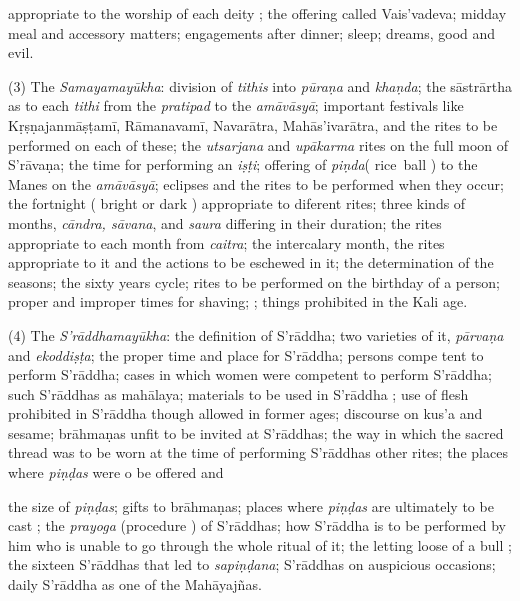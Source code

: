 \documentclass[11pt, openany]{book}
\begin{document}
\noindent
appropriate to the worship of each deity ; the offering called Vais'vadeva; midday meal and accessory matters; engagements after dinner; sleep; dreams, good and evil.

(3) The \emph{\en Samayamayūkha}: division of \emph{\en tithis} into \emph{\en pūraṇa} and \emph{\en khaṇda}; the sāstrārtha as to each \emph{\en tithi} from the \emph{\en pratipad} to the \emph{\en amāvāsyā}; important festivals like Kṛṣṇajanmāṣṭamī, Rāmanavamī, Navarātra, Mahās'ivarātra, and the rites to be performed on each of these; the \emph{\en utsarjana} and \emph{\en upākarma} rites on the full moon of S'rāvaṇa; the time for performing an \emph{\en iṣṭi}; offering of \emph{\en piṇda}( rice\textendash\ ball ) to the Manes on the \emph{\en amāvāsyā}; eclipses and the rites to be performed when they occur; the fortnight ( bright or dark ) appropriate to diferent rites; three kinds of months, \emph{\en cāndra, sāvana}, and \emph{\en saura} differing in their duration; the rites appropriate to each month from \emph{\en caitra}; the intercalary month, the rites appropriate to it and the actions to be eschewed in it; the determination of the seasons; the sixty years cycle; rites to be performed on the birthday of a person; proper and improper times for shaving; ; things prohibited in the Kali age.

(4) The \emph{\en S'rāddhamayūkha}: the definition of S'rāddha; two varieties of it, \emph{\en pārvaṇa} and \emph{\en ekoddiṣṭa}; the proper time and place for S'rāddha; persons compe tent to perform S'rāddha; cases in which women were competent to perform S'rāddha; such S'rāddhas as mahālaya; materials to be used in S'rāddha ; use of flesh prohibited in S'rāddha though allowed in former ages; discourse on kus'a and sesame; brāhmaṇas unfit to be invited at S'rāddhas; the way in which the sacred thread was to be worn at the time of performing S'rāddhas other rites; the places where \emph{\en piṇḍas} were o be offered and

\newpage

\noindent
the size of \emph{\en piṇḍas}; gifts to brāhmaṇas; places where \emph{\en piṇḍas} are ultimately to be cast ; the \emph{\en prayoga} (procedure ) of S'rāddhas; how S'rāddha is to be performed by him who is unable to go through the whole ritual of it; the letting loose of a bull ; the sixteen S'rāddhas that led to \emph{\en sapiṇḍana}; S'rāddhas on auspicious occasions; daily S'rāddha as one of the Mahāyajñas.
\end{document}
